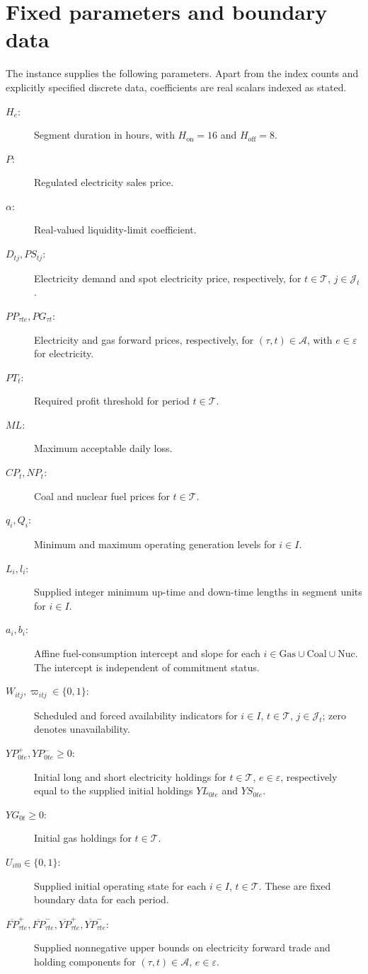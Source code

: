 \documentclass[11pt,a4paper]{article}
\begin{document}
\section*{Fixed parameters and boundary data}
The instance supplies the following parameters. Apart from the index counts and explicitly specified discrete data, coefficients are real scalars indexed as stated.
\begin{description}
\item[$H_e$:] Segment duration in hours, with $H_{\mathrm{on}}=16$ and $H_{\mathrm{off}}=8$.
\item[$P$:] Regulated electricity sales price.
\item[$\alpha$:] Real-valued liquidity-limit coefficient.
\item[$D_{tj},PS_{tj}$:] Electricity demand and spot electricity price, respectively, for $t\in\mathcal T$, $j\in\mathcal J_t$.
\item[$PP_{\tau te},PG_{\tau t}$:] Electricity and gas forward prices, respectively, for $(\tau,t)\in\mathcal A$, with $e\in\varepsilon$ for electricity.
\item[$PT_t$:] Required profit threshold for period $t\in\mathcal T$.
\item[$ML$:] Maximum acceptable daily loss.
\item[$CP_t,NP_t$:] Coal and nuclear fuel prices for $t\in\mathcal T$.
\item[$q_i,Q_i$:] Minimum and maximum operating generation levels for $i\in I$.
\item[$L_i,l_i$:] Supplied integer minimum up-time and down-time lengths in segment units for $i\in I$.
\item[$a_i,b_i$:] Affine fuel-consumption intercept and slope for each $i\in\mathrm{Gas}\cup\mathrm{Coal}\cup\mathrm{Nuc}$. The intercept is independent of commitment status.
\item[$W_{itj},\varpi_{itj}\in\{0,1\}$:] Scheduled and forced availability indicators for $i\in I$, $t\in\mathcal T$, $j\in\mathcal J_t$; zero denotes unavailability.
\item[$YP_{0te}^{+},YP_{0te}^{-}\ge0$:] Initial long and short electricity holdings for $t\in\mathcal T$, $e\in\varepsilon$, respectively equal to the supplied initial holdings $YL_{0te}$ and $YS_{0te}$.
\item[$YG_{0t}\ge0$:] Initial gas holdings for $t\in\mathcal T$.
\item[$U_{it0}\in\{0,1\}$:] Supplied initial operating state for each $i\in I$, $t\in\mathcal T$. These are fixed boundary data for each period.
\item[$\overline{FP}_{\tau te}^{+},\overline{FP}_{\tau te}^{-},\overline{YP}_{\tau te}^{+},\overline{YP}_{\tau te}^{-}$:] Supplied nonnegative upper bounds on electricity forward trade and holding components for $(\tau,t)\in\mathcal A$, $e\in\varepsilon$. 
\end{description}
\end{document}
